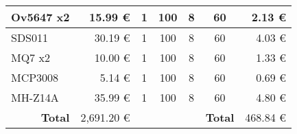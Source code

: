 \begin{table}[H]
{\begin{tabular}{l|r|cccc|r|}
			\multicolumn{1}{|l|}{Ov5647 x2}              & 15.99 €                                                      & \multicolumn{1}{c|}{1}                 & \multicolumn{1}{c|}{100}                                     & \multicolumn{1}{c|}{8}                                       & 60                                      & 2.13 €                                                       \\ \hline
			\multicolumn{1}{|l|}{SDS011}                 & 30.19 €                                                      & \multicolumn{1}{c|}{1}                 & \multicolumn{1}{c|}{100}                                     & \multicolumn{1}{c|}{8}                                       & 60                                      & 4.03 €                                                       \\ \hline
			\multicolumn{1}{|l|}{MQ7 x2}                 & 10.00 €                                                      & \multicolumn{1}{c|}{1}                 & \multicolumn{1}{c|}{100}                                     & \multicolumn{1}{c|}{8}                                       & 60                                      & 1.33 €                                                       \\ \hline
			\multicolumn{1}{|l|}{MCP3008}                & 5.14 €                                                       & \multicolumn{1}{c|}{1}                 & \multicolumn{1}{c|}{100}                                     & \multicolumn{1}{c|}{8}                                       & 60                                      & 0.69 €                                                       \\ \hline
			\multicolumn{1}{|l|}{MH-Z14A}                & 35.99 €                                                      & \multicolumn{1}{c|}{1}                 & \multicolumn{1}{c|}{100}                                     & \multicolumn{1}{c|}{8}                                       & 60                                      & 4.80 €                                                       \\ \hline
			\multicolumn{1}{r|}{\textbf{Total}}          & 2,691.20 €                                                   & \multicolumn{1}{l}{}                   & \multicolumn{1}{l}{}                                         & \multicolumn{1}{l}{}                                         & \multicolumn{1}{r|}{\textbf{Total}}     & 468.84 €                                                     \\ \cline{2-2} \cline{7-7}
		\end{tabular}%
	}
\end{table}

